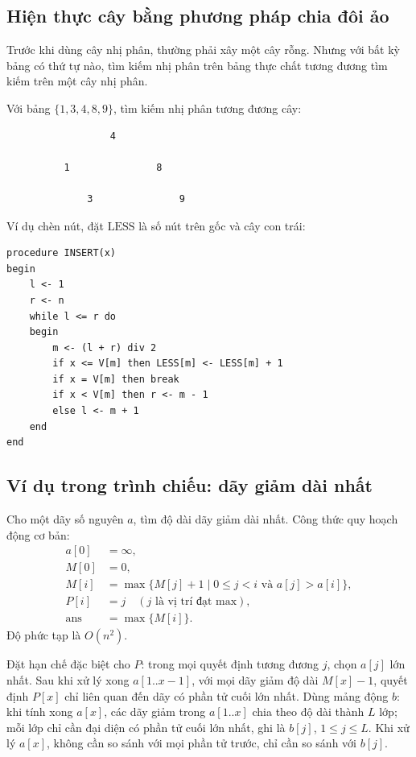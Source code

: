 \documentclass[11pt]{article}
\begin{document}
\subsection{Hiện thực cây bằng phương pháp chia đôi ảo}

Trước khi dùng cây nhị phân, thường phải xây một cây rỗng. Nhưng với bất kỳ
bảng có thứ tự nào, tìm kiếm nhị phân trên bảng thực chất tương đương tìm
kiếm trên một cây nhị phân.

Với bảng \(\{1,3,4,8,9\}\), tìm kiếm nhị phân tương đương cây:

\begin{verbatim}
                  4

          1               8

              3               9
\end{verbatim}

Ví dụ chèn nút, đặt \(\mathrm{LESS}\) là số nút trên gốc và cây con trái:

\begin{verbatim}
procedure INSERT(x)
begin
    l <- 1
    r <- n
    while l <= r do
    begin
        m <- (l + r) div 2
        if x <= V[m] then LESS[m] <- LESS[m] + 1
        if x = V[m] then break
        if x < V[m] then r <- m - 1
        else l <- m + 1
    end
end
\end{verbatim}

\subsection{Ví dụ trong trình chiếu: dãy giảm dài nhất}

Cho một dãy số nguyên \(a\), tìm độ dài dãy giảm dài nhất. Công thức quy hoạch
động cơ bản:
\[
\begin{aligned}
a[0]&=\infty,\\
M[0]&=0,\\
M[i]&=\max\{M[j]+1\mid 0\le j<i\text{ và }a[j]>a[i]\},\\
P[i]&=j\quad (j\text{ là vị trí đạt max}),\\
\mathrm{ans}&=\max\{M[i]\}.
\end{aligned}
\]
Độ phức tạp là \(O(n^2)\).

Đặt hạn chế đặc biệt cho \(P\): trong mọi quyết định tương đương \(j\), chọn
\(a[j]\) lớn nhất. Sau khi xử lý xong \(a[1..x-1]\), với mọi dãy giảm độ dài
\(M[x]-1\), quyết định \(P[x]\) chỉ liên quan đến dãy có phần tử cuối lớn
nhất. Dùng mảng động \(b\): khi tính xong \(a[x]\), các dãy giảm trong
\(a[1..x]\) chia theo độ dài thành \(L\) lớp; mỗi lớp chỉ cần đại diện có
phần tử cuối lớn nhất, ghi là \(b[j]\), \(1\le j\le L\). Khi xử lý \(a[x]\),
không cần so sánh với mọi phần tử trước, chỉ cần so sánh với \(b[j]\).
\end{document}
